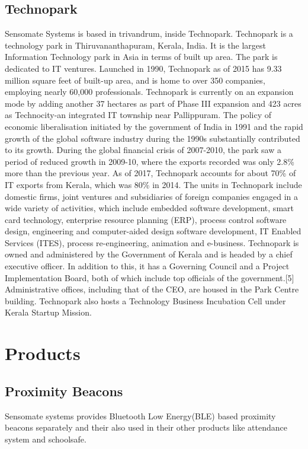 \documentclass[a4paper,12pt]{report}
\begin{document}
			\subsection{Technopark}
			Sensomate Systems is based in trivandrum, inside Technopark. Technopark is a technology park in Thiruvananthapuram, Kerala, India. It is the largest Information Technology park in Asia in terms of built up area. The park is dedicated to IT ventures. Launched in 1990, Technopark as of 2015 has 9.33 million square feet of built-up area, and is home to over 350 companies, employing nearly 60,000 professionals. Technopark is currently on an expansion mode by adding another 37 hectares as part of Phase III expansion and 423 acres as Technocity-an integrated IT township near Pallippuram. The policy of economic liberalisation initiated by the government of India in 1991 and the rapid growth of the global software industry during the 1990s substantially contributed to its growth. During the global financial crisis of 2007-2010, the park saw a period of reduced growth in 2009-10, where the exports recorded was only 2.8\% more than the previous year. As of 2017, Technopark accounts for about 70\% of IT exports from Kerala, which was 80\% in 2014.
			The units in Technopark include domestic firms, joint ventures and subsidiaries of foreign companies engaged in a wide variety of activities, which include embedded software development, smart card technology, enterprise resource planning (ERP), process control software design, engineering and computer-aided design software development, IT Enabled Services (ITES), process re-engineering, animation and e-business. Technopark is owned and administered by the Government of Kerala and is headed by a chief executive officer. In addition to this, it has a Governing Council and a Project Implementation Board, both of which include top officials of the government.[5] Administrative offices, including that of the CEO, are housed in the Park Centre building. Technopark also hosts a Technology Business Incubation Cell under Kerala Startup Mission.
		\newpage
		\section{Products}
			\subsection{Proximity Beacons}
			Sensomate systems provides Bluetooth Low Energy(BLE) based proximity beacons separately and their also used in their other products like attendance system and schoolsafe.
\end{document}
